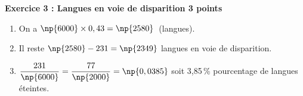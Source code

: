 \textbf{Exercice 3 : Langues en voie de disparition \hfill 3 points}

\medskip

%

\begin{enumerate}
\item %

On a $\np{6000} \times 0,43 = \np{2580}$~(langues).
\item %
Il reste $\np{2580} - 231 = \np{2349}$ langues  en voie de disparition.
\item %
$\dfrac{231}{\np{6000}} = \dfrac{77}{\np{2000}} = \np{0,0385}$ soit 3,85\,\% pourcentage de langues éteintes.
\end{enumerate} 

\vspace{0,5cm}


